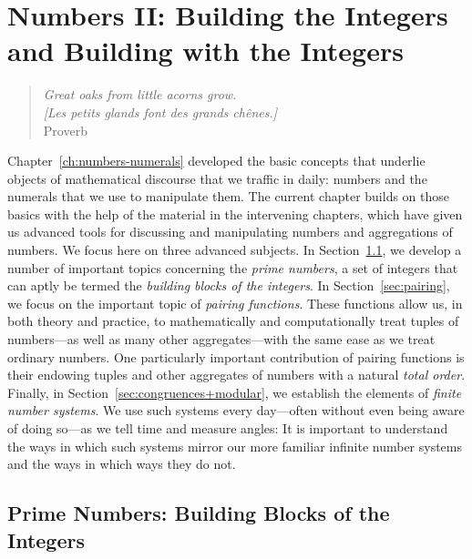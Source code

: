 
\chapter{Numbers II:
Building the Integers and Building with the Integers}
\label{ch:numbers-advanced}

\begin{quote}
{\em Great oaks from little acorns grow.} \\
{\em [Les petits glands font des grands ch\^enes.]} \\
\hspace*{2in}Proverb
\end{quote}

Chapter~\ref{ch:numbers-numerals} developed the basic concepts that underlie objects of mathematical discourse that we traffic in daily: numbers and the numerals that we use to manipulate them.  The current chapter builds on those basics with the help of the material in the intervening chapters, which have given us advanced tools for discussing and manipulating numbers and aggregations of numbers.  We focus here on three advanced subjects.  In Section~\ref{sec:primes}, we develop a number of important topics concerning the {\em prime numbers}, a set of integers that can aptly be termed the {\it building blocks of the integers}.  In
Section~\ref{sec:pairing}, we focus on the important topic of {\it pairing functions}.  These functions allow us, in both theory and practice, to mathematically and computationally treat tuples of
numbers---as well as many other aggregates---with the same ease as we treat ordinary numbers.  One particularly important contribution of pairing functions is their endowing tuples and other aggregates of numbers with a natural {\em total order}.  Finally, in Section~\ref{sec:congruences+modular}, we establish the elements of {\em finite number systems}.  We use such systems every day---often without even being aware of doing so---as we tell time and measure angles: It is important to understand the ways in which such systems mirror our more familiar infinite number systems and the ways in which ways they do not.
 

\section{Prime Numbers: Building Blocks of the Integers}
\label{sec:primes}

